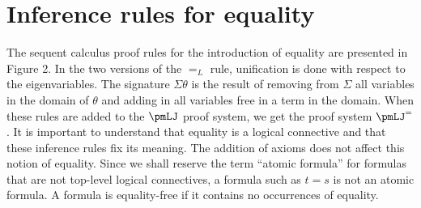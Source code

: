 \section*{Inference rules for equality}
The sequent calculus proof rules for the introduction of equality are presented in Figure 2. In the two versions of the $=_L$ rule, unification is done with respect to the eigenvariables. The signature $\Sigma\theta$ is the result of removing from $\Sigma$ all variables in the domain of $\theta$ and adding in all variables free in a term in the domain. When these rules are added to the $\pmLJ$ proof system, we get the proof system $\pmLJ^=$. It is important to understand that equality is a logical connective and that these inference rules fix its meaning. The addition of axioms does not affect this notion of equality. Since we shall reserve the term ``atomic formula'' for formulas that are not top-level logical connectives, a formula such as $t=s$ is not an atomic formula.
A formula is equality-free if it contains no occurrences of equality.
